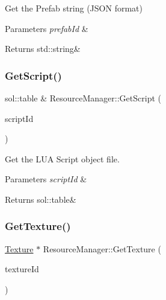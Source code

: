 Get the Prefab string (J\+S\+ON format) 


\begin{DoxyParams}{Parameters}
{\em prefab\+Id} & \\
\hline
\end{DoxyParams}
\begin{DoxyReturn}{Returns}
std\+::string\& 
\end{DoxyReturn}
\mbox{\label{classResourceManager_ad38f74c18fb1f4750f207ca19da3de33}} 
\subsubsection{\texorpdfstring{Get\+Script()}{GetScript()}}
{\footnotesize\ttfamily sol\+::table \& Resource\+Manager\+::\+Get\+Script (\begin{DoxyParamCaption}\item[{\hyperlink{classStringId}{String\+Id}}]{script\+Id }\end{DoxyParamCaption})}



Get the L\+UA Script object file. 


\begin{DoxyParams}{Parameters}
{\em script\+Id} & \\
\hline
\end{DoxyParams}
\begin{DoxyReturn}{Returns}
sol\+::table\& 
\end{DoxyReturn}
\mbox{\label{classResourceManager_a9bb5a0470852ea85f850a27b8d9133ff}} 
\subsubsection{\texorpdfstring{Get\+Texture()}{GetTexture()}}
{\footnotesize\ttfamily \hyperlink{classTexture}{Texture} $\ast$ Resource\+Manager\+::\+Get\+Texture (\begin{DoxyParamCaption}\item[{\hyperlink{classStringId}{String\+Id}}]{texture\+Id }\end{DoxyParamCaption})}



